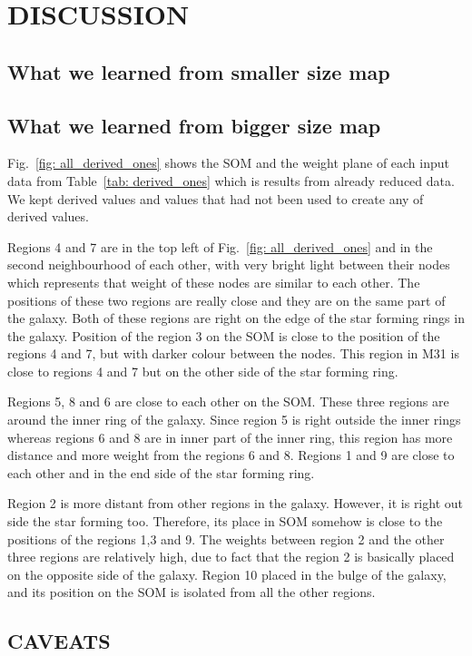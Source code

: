 
\section{DISCUSSION}
    \subsection{What we learned from smaller size map}
    \subsection{What we learned from bigger size map}
    Fig.~\ref{fig: all_derived_ones} shows the SOM and the weight plane of each input data from Table~\ref{tab: derived_ones} which is results from already reduced data.
    We kept derived values and values that had not been used to create any of derived values.
    
    Regions 4 and 7 are in the top left of Fig.~\ref{fig: all_derived_ones} and in the second neighbourhood of each other, with very bright light between their nodes which represents that weight of these nodes are similar to each other. 
    The positions of these two regions are really close and they are on the same part of the galaxy.
    Both of these regions are right on the edge of the star forming rings in the galaxy. 
    Position of the region 3 on the SOM is close to the position of the     regions 4 and 7, but with darker colour between the nodes. 
    This region in M31 is close to regions 4 and 7 but on the other side of the star forming ring.
    
    Regions 5, 8 and 6 are close to each other on the SOM.
    These three regions are around the inner ring of the galaxy.
    Since region 5 is right outside the inner rings whereas regions 6 and 8 are in inner part of the inner ring, this region has more distance and more weight from the regions 6 and 8.
    Regions 1 and 9 are close to each other and in the end side of the star forming ring. 
    
    Region 2 is more distant from other regions in the galaxy. 
    However, it is right out side the star forming too. 
    Therefore, its place in SOM somehow is close to the positions of the regions 1,3 and 9.
    The weights between region 2 and the other three regions are relatively high, due to fact that the region 2 is basically placed on the opposite side of the galaxy. 
    Region 10 placed in the bulge of the galaxy, and its position on the SOM is isolated from all the other regions. 

    \subsection{CAVEATS}